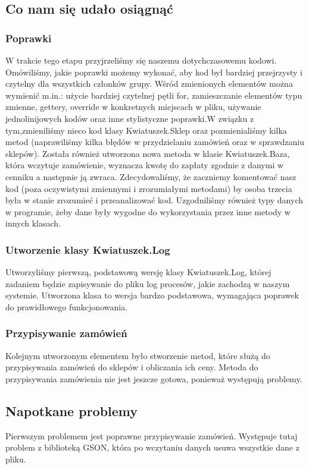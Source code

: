 \documentclass{article}
\begin{document}
        \subsection{Co nam się udało osiągnąć}
        \subsubsection{Poprawki}
        W trakcie tego etapu przyjrzeliśmy się naszemu dotychczasowemu kodowi. Omówiliśmy, jakie poprawki możemy wykonać, aby kod był bardziej przejrzysty i czytelny dla wszystkich członków grupy. Wśród zmienionych elementów można wymienić m.in.: użycie bardziej czytelnej pętli for, zamieszczanie elementów typu zmienne, gettery, override w konkretnych miejscach w pliku, używanie jednolinijowych kodów oraz inne stylistyczne poprawki.W związku z tym,zmieniliśmy nieco kod klasy Kwiatuszek.Sklep oraz pozmienialiśmy kilka metod (naprawiliśmy kilka błędów w przydzielaniu zamówień oraz w sprawdzaniu sklepów). Została również utworzona nowa metoda w klasie Kwiatuszek.Baza, która wczytuje zamówienie, wyznacza kwotę do zapłaty zgodnie z danymi w cenniku a następnie ją zwraca. Zdecydowaliśmy, że zaczniemy komentować nasz kod (poza oczywistymi zmiennymi i zrozumiałymi metodami) by osoba trzecia była w stanie zrozumieć i przeanalizować kod. Uzgodniliśmy również typy danych w programie, żeby dane były wygodne do wykorzystania przez inne metody w innych klasach.
        \subsubsection{Utworzenie klasy Kwiatuszek.Log}
        Utworzyliśmy pierwszą, podstawową wersję klasy Kwiatuszek.Log, której zadaniem będzie zapisywanie do pliku log procesów, jakie zachodzą w naszym systemie. Utworzona klasa to wersja bardzo podstawowa, wymagająca poprawek do prawidłowego funkcjonowania.
        \subsubsection{Przypisywanie zamówień}
        Kolejnym utworzonym elementem było stworzenie metod, które służą do przypisywania zamówień do sklepów i obliczania ich ceny. Metoda do przypisywania zamówienia nie jest jeszcze gotowa, ponieważ występują problemy.
        \subsection{Napotkane problemy}
        Pierwszym problemem jest poprawne przypisywanie zamówień. Występuje tutaj problem z biblioteką GSON, która po wczytaniu danych usuwa wszystkie dane z pliku.
        
\end{document}
